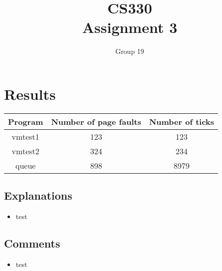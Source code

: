 \documentclass{article}
\author{Group 19}
\title{CS330 \\ Assignment 3}
\date{}
\begin{document}
\maketitle

\section{Results}
\begin{center}
\begin{tabular}{| c | c | c |}
\hline
\textbf{Program} & \textbf{Number of page faults} & \textbf{Number of ticks}\\
\hline
vmtest1 & 123 & 123 \\
\hline
vmtest2 & 324 & 234 \\
\hline
queue & 898 & 8979 \\
\hline
\end{tabular}
\end{center}
\subsection{Explanations}
\begin{itemize}
\item test
\end{itemize}
\subsection{Comments}
\begin{itemize}
\item test
\end{itemize}
\end{document}
